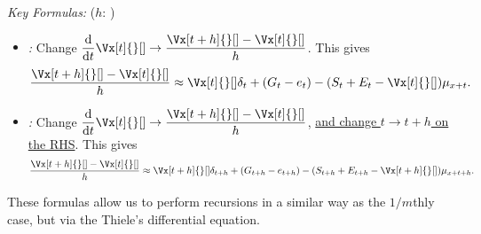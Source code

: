 \begin{enumerate}
\emph{Key Formulas:} (\(h\): )
\begin{itemize}
\item \emph{:} Change
\(\displaystyle \dv{}{t}\Vx[t]{}[]\to\frac{\Vx[t+h]{}[]-\Vx[t]{}[]}{h}\). This gives
\[
\frac{\Vx[t+h]{}[]-\Vx[t]{}[]}{h}
\approx \Vx[t]{}[]\delta_t+(G_t-e_t)
-(S_t+E_t-\Vx[t]{}[])\mu_{x+t}.
\]
\item \emph{:} Change \(\displaystyle
\dv{}{t}\Vx[t]{}[]\to\frac{\Vx[t+h]{}[]-\Vx[t]{}[]}{h}\), \underline{and change \(t\to
t+h\) on the RHS}. This gives
\[
\frac{\Vx[t+h]{}[]-\Vx[t]{}[]}{h}
\approx \Vx[t+h]{}[]\delta_{t+h}+(G_{t+h}-e_{t+h})
-(S_{t+h}+E_{t+h}-\Vx[t+h]{}[])\mu_{x+t+h}.
\]
\end{itemize}
These formulas allow us to perform recursions in a similar way as the
\(1/m\)thly case, but via the Thiele's differential equation.
\end{enumerate}
